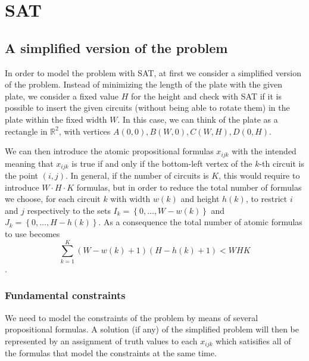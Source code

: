 \documentclass[]{article}
\title{}
\author{}
\begin{document}
\maketitle

\section{SAT}
\subsection{A simplified version of the problem}
In order to model the problem with SAT, at first we consider a simplified version of the problem. Instead of minimizing the length of the plate with the given plate, we consider a fixed value $H$ for the height and check with SAT if it is possible to insert the given circuits (without being able to rotate them) in the plate within the fixed width $W$. In this case, we can think of the plate as a rectangle in $\mathbb{R}^2$, with vertices $A(0,0), B(W,0), C(W,H), D(0,H)$.

We can then introduce the atomic propositional formulas $x_{ijk}$ with the intended meaning that $x_{ijk}$ is true if and only if the bottom-left vertex of the $k$-th circuit is the point $(i,j)$.
In general, if the number of circuits is $K$, this would require to introduce $W\cdot H\cdot K$ formulas, but in order to reduce the total number of formulas we choose, for each circuit $k$ with width $w(k)$ and height $h(k)$, to restrict $i$ and $j$ respectively to the sets $I_k=\left\{0, \dots, W-w(k)\right\}$ and $J_k=\left\{0, \dots, H-h(k)\right\}$. As a consequence the total number of atomic formulas to use becomes $$\sum_{k=1}^K \left(W-w(k)+1\right) \left(H-h(k)+1\right) < WHK$$.

\subsubsection{Fundamental constraints}
We need to model the constraints of the problem by means of several propositional formulas. A solution (if any) of the simplified problem will then be represented by an assignment of truth values to each $x_{ijk}$ which satisifies all of the formulas that model the constraints at the same time. 
\end{document}

